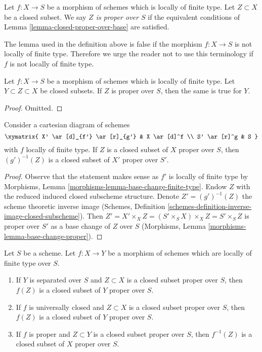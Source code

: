 \begin{definition}
\label{definition-proper-over-base}
Let $f : X \to S$ be a morphism of schemes which is locally of finite type.
Let $Z \subset X$ be a closed subset.
We say {\it $Z$ is proper over $S$}
if the equivalent conditions of Lemma \ref{lemma-closed-proper-over-base}
are satisfied.
\end{definition}

\noindent
The lemma used in the definition above is false if the morphism
$f : X \to S$ is not locally of finite type. Therefore we urge
the reader not to use this terminology if $f$ is not locally of
finite type.

\begin{lemma}
\label{lemma-closed-closed-proper-over-base}
Let $f : X \to S$ be a morphism of schemes which is locally of finite type.
Let $Y \subset Z \subset X$ be closed subsets.
If $Z$ is proper over $S$, then the same is true for $Y$.
\end{lemma}

\begin{proof}
Omitted.
\end{proof}

\begin{lemma}
\label{lemma-base-change-closed-proper-over-base}
Consider a cartesian diagram of schemes
$$
\xymatrix{
X' \ar[d]_{f'} \ar[r]_{g'} & X \ar[d]^f \\
S' \ar[r]^g & S
}
$$
with $f$ locally of finite type.
If $Z$ is a closed subset of $X$ proper over $S$, then
$(g')^{-1}(Z)$ is a closed subset of $X'$ proper over $S'$.
\end{lemma}

\begin{proof}
Observe that the statement makes sense as $f'$ is locally of
finite type by Morphisms, Lemma \ref{morphisms-lemma-base-change-finite-type}.
Endow $Z$ with the reduced induced closed subscheme structure.
Denote $Z' = (g')^{-1}(Z)$ the scheme theoretic inverse image
(Schemes, Definition \ref{schemes-definition-inverse-image-closed-subscheme}).
Then $Z' = X' \times_X Z = (S' \times_S X) \times_X Z = S' \times_S Z$
is proper over $S'$ as a base change of $Z$ over $S$
(Morphisms, Lemma \ref{morphisms-lemma-base-change-proper}).
\end{proof}

\begin{lemma}
\label{lemma-functoriality-closed-proper-over-base}
Let $S$ be a scheme. Let $f : X \to Y$ be a morphism of schemes which
are locally of finite type over $S$.
\begin{enumerate}
\item If $Y$ is separated over $S$ and $Z \subset X$ is a closed subset
proper over $S$, then $f(Z)$ is a closed subset of $Y$ proper over $S$.
\item If $f$ is universally closed and $Z \subset X$ is a
closed subset proper over $S$, then $f(Z)$ is a closed subset
of $Y$ proper over $S$.
\item If $f$ is proper and $Z \subset Y$ is a closed subset
proper over $S$, then $f^{-1}(Z)$ is a closed subset of $X$ proper over $S$.
\end{enumerate}
\end{lemma}

